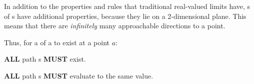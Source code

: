 In addition to the properties and rules that traditional real-valued limits have, s of s have additional properties, because they lie on a 2-dimensional plane.
This means that there are \textit{infinitely} many approachable directions to a point.

Thus, for a  of a  to exist at a point $a$:
\begin{propertylist}
\item \textbf{ALL} path s \textbf{MUST} exist.
\item \textbf{ALL} path s \textbf{MUST} evaluate to the same value.
\end{propertylist}


